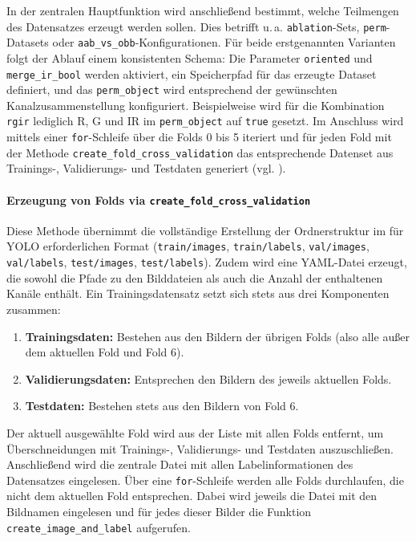 In der zentralen Hauptfunktion wird anschließend bestimmt, welche Teilmengen des Datensatzes erzeugt werden sollen. Dies betrifft u.\,a. \texttt{ablation}-Sets, \texttt{perm}-Datasets oder \texttt{aab\_vs\_obb}-Konfigurationen. Für beide erstgenannten Varianten folgt der Ablauf einem konsistenten Schema: Die Parameter \texttt{oriented} und \texttt{merge\_ir\_bool} werden aktiviert, ein Speicherpfad für das erzeugte Dataset definiert, und das \texttt{perm\_object} wird entsprechend der gewünschten Kanalzusammenstellung konfiguriert. Beispielweise wird für die Kombination \texttt{rgir} lediglich R, G und IR im \texttt{perm\_object} auf \texttt{true} gesetzt. Im Anschluss wird mittels einer \texttt{for}-Schleife über die Folds 0 bis 5 iteriert und für jeden Fold mit der Methode \texttt{create\_fold\_cross\_validation} das entsprechende Datenset aus Trainings-, Validierungs- und Testdaten generiert (vgl. ).

\paragraph{Erzeugung von Folds via \texttt{create\_fold\_cross\_validation}}

Diese Methode übernimmt die vollständige Erstellung der Ordnerstruktur im für YOLO erforderlichen Format (\texttt{train/images}, \texttt{train/labels}, \texttt{val/images}, \texttt{val/labels}, \texttt{test/images}, \texttt{test/labels}). Zudem wird eine YAML-Datei erzeugt, die sowohl die Pfade zu den Bilddateien als auch die Anzahl der enthaltenen Kanäle enthält. Ein Trainingsdatensatz setzt sich stets aus drei Komponenten zusammen: 
\begin{enumerate}
    \item \textbf{Trainingsdaten:} Bestehen aus den Bildern der übrigen Folds (also alle außer dem aktuellen Fold und Fold 6).
    \item \textbf{Validierungsdaten:} Entsprechen den Bildern des jeweils aktuellen Folds.
    \item \textbf{Testdaten:} Bestehen stets aus den Bildern von Fold 6.
\end{enumerate}

Der aktuell ausgewählte Fold wird aus der Liste mit allen Folds entfernt, um Überschneidungen mit Trainings-, Validierungs- und Testdaten auszuschließen. Anschließend wird die zentrale Datei mit allen Labelinformationen des Datensatzes eingelesen. Über eine \texttt{for}-Schleife werden alle Folds durchlaufen, die nicht dem aktuellen Fold entsprechen. Dabei wird jeweils die Datei mit den Bildnamen eingelesen und für jedes dieser Bilder die Funktion \texttt{create\_image\_and\_label} aufgerufen.

